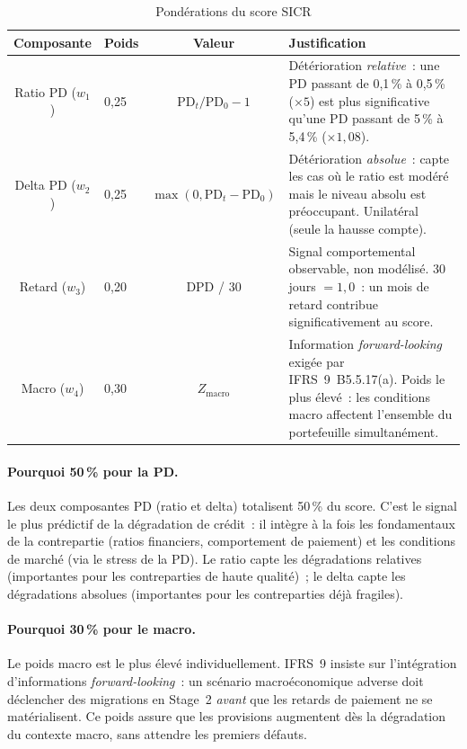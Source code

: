 \documentclass[12pt, a4paper, twoside, openright]{report}
\theoremstyle{definition}
\begin{document}
\begin{table}[htbp]
\centering
\caption{Pondérations du score SICR}
\label{tab:sicr-poids}
\begin{tabular}{clcp{5.5cm}}
\toprule
Composante & Poids & Valeur & Justification \\
\midrule
Ratio PD ($w_1$) & 0{,}25 & $\text{PD}_t / \text{PD}_0 - 1$ & Détérioration \emph{relative}~: une PD passant de 0{,}1\,\% à 0{,}5\,\% ($\times 5$) est plus significative qu'une PD passant de 5\,\% à 5{,}4\,\% ($\times 1{,}08$). \\
Delta PD ($w_2$) & 0{,}25 & $\max(0, \text{PD}_t - \text{PD}_0)$ & Détérioration \emph{absolue}~: capte les cas où le ratio est modéré mais le niveau absolu est préoccupant. Unilatéral (seule la hausse compte). \\
Retard ($w_3$) & 0{,}20 & DPD / 30 & Signal comportemental observable, non modélisé. 30 jours $= 1{,}0$~: un mois de retard contribue significativement au score. \\
Macro ($w_4$) & 0{,}30 & $Z_{\text{macro}}$ & Information \emph{forward-looking} exigée par IFRS~9~B5.5.17(a). Poids le plus élevé~: les conditions macro affectent l'ensemble du portefeuille simultanément. \\
\bottomrule
\end{tabular}
\end{table}

\paragraph{Pourquoi 50\,\% pour la PD.} Les deux composantes PD (ratio et delta) totalisent 50\,\% du score. C'est le signal le plus prédictif de la dégradation de crédit~: il intègre à la fois les fondamentaux de la contrepartie (ratios financiers, comportement de paiement) et les conditions de marché (via le stress de la PD). Le ratio capte les dégradations relatives (importantes pour les contreparties de haute qualité)~; le delta capte les dégradations absolues (importantes pour les contreparties déjà fragiles).

\paragraph{Pourquoi 30\,\% pour le macro.} Le poids macro est le plus élevé individuellement. IFRS~9 insiste sur l'intégration d'informations \emph{forward-looking}~: un scénario macroéconomique adverse doit déclencher des migrations en Stage~2 \emph{avant} que les retards de paiement ne se matérialisent. Ce poids assure que les provisions augmentent dès la dégradation du contexte macro, sans attendre les premiers défauts.
\end{document}
